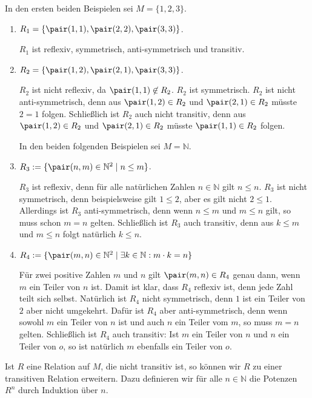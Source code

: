 \examples
In den ersten beiden Beispielen sei $M = \{1,2,3\}$.
\begin{enumerate}
\item $R_1 = \{ \pair(1,1), \pair(2,2), \pair(3,3) \}$.

      $R_1$ ist reflexiv, symmetrisch, anti-symmetrisch und transitiv.
\item $R_2 = \{ \pair(1,2), \pair(2,1), \pair(3,3) \}$.

      $R_2$ ist nicht reflexiv, da $\pair(1,1) \not\in R_2$.
      $R_2$ ist symmetrisch. 
      $R_2$ ist nicht anti-symmetrisch, denn aus $\pair(1,2) \in R_2$ und 
      $\pair(2,1) \in R_2$ m\"{u}sste $2=1$ folgen.
      Schließlich ist $R_2$ auch nicht transitiv, denn aus $\pair(1,2) \in R_2$ und 
      $\pair(2,1) \in R_2$ m\"{u}sste $\pair(1,1) \in R_2$ folgen.

      In den beiden folgenden Beispielen sei $M = \mathbb{N}$.
\item $R_3 := \{ \pair(n,m) \in \mathbb{N}^2 \mid n \leq m \}$.

      $R_3$ ist reflexiv, denn f\"{u}r alle nat\"{u}rlichen Zahlen $n \in \mathbb{N}$ gilt 
      $n \leq n$.  $R_3$ ist nicht symmetrisch, denn beispielsweise gilt
      $1 \leq 2$, aber es gilt nicht $2 \leq 1$.  Allerdings ist $R_3$ anti-symmetrisch,
      denn wenn $n \leq m$  und $m \leq n$ gilt, so muss schon $m = n$ gelten.
      Schließlich ist $R_3$ auch transitiv, denn aus $k \leq m$ und $m \leq n$ folgt
      nat\"{u}rlich $k \leq n$.
\item $R_4 := \{ \pair(m,n) \in \mathbb{N}^2 \mid \exists k\in \mathbb{N}: m\cdot k = n \}$

      F\"{u}r zwei positive Zahlen $m$ und $n$ gilt $\pair(m,n) \in R_4$ genau dann, wenn $m$ ein
      Teiler von $n$ ist.  Damit ist klar, dass $R_4$ reflexiv ist, denn jede Zahl
      teilt sich selbst.  Nat\"{u}rlich ist $R_4$ nicht symmetrisch, denn $1$ ist ein Teiler
      von $2$ aber nicht umgekehrt.  Daf\"{u}r ist $R_4$ aber anti-symmetrisch, denn wenn 
      sowohl $m$ ein Teiler von $n$ ist und auch $n$ ein Teiler vom $m$, so muss $m = n$
      gelten.  Schließlich ist $R_4$ auch transitiv: Ist $m$ ein Teiler von $n$ und
      $n$ ein Teiler von $o$, so ist nat\"{u}rlich $m$ ebenfalls ein Teiler von $o$.
      \eox
\end{enumerate}
Ist $R$ eine Relation auf $M$, die nicht transitiv ist, so k\"{o}nnen wir $R$ zu einer
transitiven Relation erweitern.  Dazu definieren wir f\"{u}r alle $n \in \mathbb{N}$ die
Potenzen $R^n$ durch Induktion \"{u}ber $n$.
